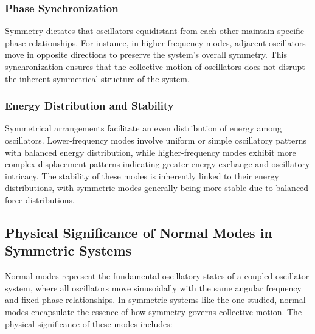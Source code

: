 \documentclass[12pt]{report} %
\begin{document}
\subsubsection{Phase Synchronization}
\label{subsubsec:part5_phase_synchronization}

Symmetry dictates that oscillators equidistant from each other maintain specific phase relationships. For instance, in higher-frequency modes, adjacent oscillators move in opposite directions to preserve the system's overall symmetry. This synchronization ensures that the collective motion of oscillators does not disrupt the inherent symmetrical structure of the system.

\subsubsection{Energy Distribution and Stability}
\label{subsubsec:part5_energy_distribution}

Symmetrical arrangements facilitate an even distribution of energy among oscillators. Lower-frequency modes involve uniform or simple oscillatory patterns with balanced energy distribution, while higher-frequency modes exhibit more complex displacement patterns indicating greater energy exchange and oscillatory intricacy. The stability of these modes is inherently linked to their energy distributions, with symmetric modes generally being more stable due to balanced force distributions.



\subsection{Physical Significance of Normal Modes in Symmetric Systems}
\label{subsec:part5_physical_significance}

Normal modes represent the fundamental oscillatory states of a coupled oscillator system, where all oscillators move sinusoidally with the same angular frequency and fixed phase relationships. In symmetric systems like the one studied, normal modes encapsulate the essence of how symmetry governs collective motion. The physical significance of these modes includes:
\end{document}
